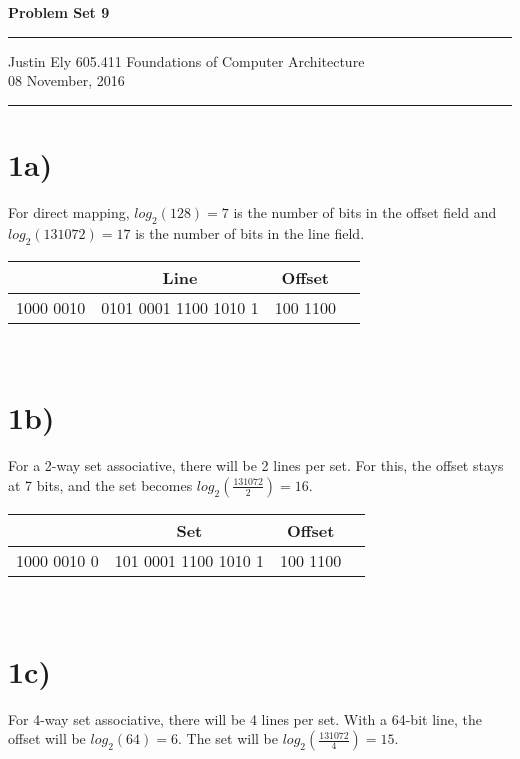 \documentclass[a4paper,11pt]{article}
\begin{document}
\begin{flushright}

\vspace{1.1cm}

{\bf\Huge Problem Set 9}

\rule{0.25\linewidth}{0.5pt}

\vspace{0.5cm}
Justin Ely
\linebreak
\newline
\footnotesize{605.411 Foundations of Computer Architecture \\}
\vspace{0.5cm}
08 November, 2016
\end{flushright}

\noindent\rule{\linewidth}{1.0pt}


\section*{1a)}
For direct mapping, $log_2(128) = 7$ is the number of bits in the offset field and $log_2(131072) = 17$ is the number of
bits in the line field.  \\

\begin{tabular}{| l | c | c | c |}
  \hline	
      & Line & Offset  \\  \hline \hline
      1000 0010 & 0101 0001 1100 1010 1 & 100 1100 \\ \hline
\end{tabular} \\

\section*{1b)}
For a 2-way set associative, there will be 2 lines per set.  For this, the offset stays at 7 bits, and the set becomes $log_2(\frac{131072}{2}) = 16$.

\begin{tabular}{| l | c | c | c |}
  \hline	
      & Set & Offset  \\  \hline \hline
      1000 0010  0 & 101 0001 1100 1010 1 & 100 1100 \\ \hline
\end{tabular} \\

\section*{1c)}
For 4-way set associative, there will be 4 lines per set.  With a 64-bit line, the offset will be $log_2(64) = 6$.  The set will be
$log_2(\frac{131072}{4}) = 15$. 
\end{document}
